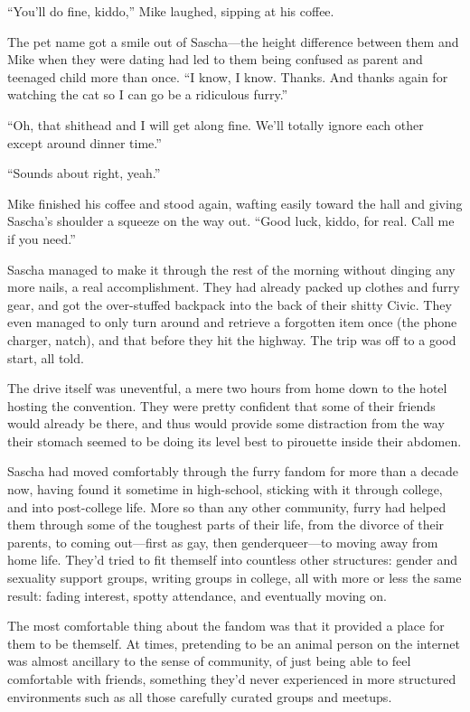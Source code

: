 ``You'll do fine, kiddo,'' Mike laughed, sipping at his coffee.

The pet name got a smile out of Sascha---the height difference between them and Mike when they were dating had led to them being confused as parent and teenaged child more than once. ``I know, I know. Thanks. And thanks again for watching the cat so I can go be a ridiculous furry.''

``Oh, that shithead and I will get along fine. We'll totally ignore each other except around dinner time.''

``Sounds about right, yeah.''

Mike finished his coffee and stood again, wafting easily toward the hall and giving Sascha's shoulder a squeeze on the way out. ``Good luck, kiddo, for real. Call me if you need.''

\secdiv{}

Sascha managed to make it through the rest of the morning without dinging any more nails, a real accomplishment. They had already packed up clothes and furry gear, and got the over-stuffed backpack into the back of their shitty Civic. They even managed to only turn around and retrieve a forgotten item once (the phone charger, natch), and that before they hit the highway. The trip was off to a good start, all told.

The drive itself was uneventful, a mere two hours from home down to the hotel hosting the convention. They were pretty confident that some of their friends would already be there, and thus would provide some distraction from the way their stomach seemed to be doing its level best to pirouette inside their abdomen.

Sascha had moved comfortably through the furry fandom for more than a decade now, having found it sometime in high-school, sticking with it through college, and into post-college life. More so than any other community, furry had helped them through some of the toughest parts of their life, from the divorce of their parents, to coming out---first as gay, then genderqueer---to moving away from home life. They'd tried to fit themself into countless other structures: gender and sexuality support groups, writing groups in college, all with more or less the same result: fading interest, spotty attendance, and eventually moving on.

The most comfortable thing about the fandom was that it provided a place for them to be themself. At times, pretending to be an animal person on the internet was almost ancillary to the sense of community, of just being able to feel comfortable with friends, something they'd never experienced in more structured environments such as all those carefully curated groups and meetups.


